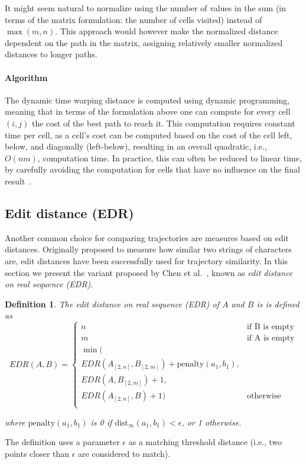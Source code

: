 \documentclass[10pt,letterpaper]{article}
\newcommand{\dist}{\ensuremath{\text{dist}}}
\newtheorem{definition}{Definition}
\begin{document}
It might seem natural to normalize using the number of values in the sum (in terms of the matrix formulation: the number of cells visited) instead of $\max (m,n)$. This approach would however make the normalized distance dependent on the path in the matrix, assigning relatively smaller normalized distances to longer paths. 

\paragraph{Algorithm}
The dynamic time warping distance is computed using dynamic programming, meaning that in terms of the formulation above one can compute for every cell $(i,j)$ the cost of the best path to reach it. This computation requires constant time per cell, as a cell's cost can be computed based on the cost of the cell left, below, and diagonally (left-below), resulting in an overall quadratic, i.e., $O(nm)$, computation time.
In practice, this can often be reduced to linear time, by carefully avoiding the computation for cells that have no influence on the final result~\cite{keogh2005exact}.


\subsection{Edit distance (EDR)}
Another common choice for comparing trajectories are measures based on edit distances.
Originally proposed to measure how similar two strings of characters are, edit distances have been successfully used for trajectory similarity.
In this section we present the variant proposed by Chen et al.~\cite{ChenOO05}, known as \emph{edit distance on real sequence (EDR)}.

\begin{definition}
The edit distance on real sequence (EDR) of $A$ and $B$ is is defined as
\[
EDR(A,B) =
\left\{
	\begin{array}{ll}
		n  & \mbox{if B is empty} \\
		m  & \mbox{if A is empty} \\
		\min( \\EDR(A_{[2,n]},B_{[2,m]})+\mbox{penalty}(a_1,b_1), \\
			  EDR(A,B_{[2,m]}) +1, \\
			EDR(A_{[2,n]},B)+ 1) & \mbox{otherwise } \\
		\end{array}
\right.
\]

where $\mbox{penalty}(a_1,b_1)$ is 0 if $\dist_\infty(a_1,b_1) < \epsilon $, or 1 otherwise.
\end{definition}
The definition uses a parameter $\epsilon$ as a matching threshold distance (i.e., two points closer than $\epsilon$ are considered to match).
\end{document}
